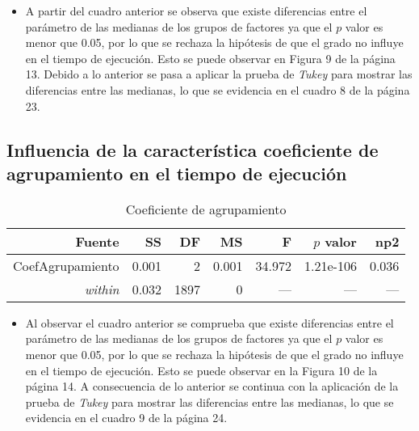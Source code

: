 \documentclass{article}
\begin{document}
\begin{itemize}
  \item A partir del cuadro anterior se observa que existe diferencias entre el parámetro de las medianas de los grupos de factores ya que el $p$ valor es menor que 0.05, por lo que se rechaza la hipótesis de que el grado no influye en el tiempo de ejecución. Esto se puede observar en Figura 9 de la página 13. Debido a lo anterior se pasa a aplicar la prueba de \textit{Tukey} para mostrar las diferencias entre las medianas, lo que se evidencia en el cuadro 8 de la página 23.   
\end{itemize}


\subsection{Influencia de la característica coeficiente de agrupamiento en el tiempo de ejecución} 

\begin{table}[H]
\caption{{\small Coeficiente de agrupamiento}}
\begin{center}		
	\centering
		\begin{tabular}{rrrrrrr}		
			\hline
			\textbf{Fuente} & \textbf{SS} & \textbf{DF} & \textbf{MS}& \textbf{F}& \textbf{$p$ valor} & \textbf{np2}\\
			
			\hline
			 CoefAgrupamiento & 0.001 & 2 & 0.001 & 34.972 & 1.21e-106 & 0.036 \\
			 \textit{within}    & 0.032 & 1897 & 0  & --- & --- & --- \\			 			 
			\hline
		\end{tabular}
		\label{cual}
	\label{tab:una-tablita}
\end{center}	
\end{table}

\begin{itemize}
  \item Al observar el cuadro anterior se comprueba que existe diferencias entre el parámetro de las medianas de los grupos de factores ya que el $p$ valor es menor que 0.05, por lo que se rechaza la hipótesis de que el grado no influye en el tiempo de ejecución. Esto se puede observar en la Figura 10 de la página 14. A consecuencia de lo anterior se continua con la aplicación de la prueba de \textit{Tukey} para mostrar las diferencias entre las medianas, lo que se evidencia en el cuadro 9 de la página 24.   
\end{itemize}
\end{document}
